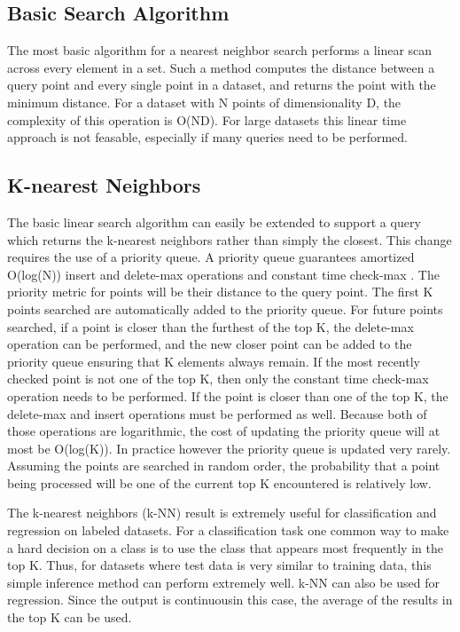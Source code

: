 \subsection{Basic Search Algorithm}

The most basic algorithm for a nearest neighbor search performs a linear scan across every element in a set.  Such a method computes the distance between a query point and every single point in a dataset, and returns the point with the minimum distance.  For a dataset with N points of dimensionality D, the complexity of this operation is O(ND).  For large datasets this linear time approach is not feasable, especially if many queries need to be performed.

\subsection{K-nearest Neighbors}
\label{subsec:knn}

The basic linear search algorithm can easily be extended to support a query which returns the k-nearest neighbors rather than simply the closest.  This change requires the use of a priority queue.  A priority queue guarantees amortized O(log(N)) insert and delete-max operations and constant time check-max \citep{van1976design}.  The priority metric for points will be their distance to the query point.  The first K points searched are automatically added to the priority queue.  For future points searched, if a point is closer than the furthest of the top K, the delete-max operation can be performed, and the new closer point can be added to the priority queue ensuring that K elements always remain.  If the most recently checked point is not one of the top K, then only the constant time check-max operation needs to be performed.  If the point is closer than one of the top K, the delete-max and insert operations must be performed as well.  Because both of those operations are logarithmic, the cost of updating the priority queue will at most be O(log(K)).  In practice however the priority queue is updated very rarely.  Assuming the points are searched in random order, the probability that a point being processed will be one of the current top K encountered is relatively low.

The k-nearest neighbors (k-NN) result is extremely useful for classification and regression on labeled datasets.  For a classification task one common way to make a hard decision on a class is to use the class that appears most frequently in the top K.  Thus, for datasets where test data is very similar to training data, this simple inference method can perform extremely well.  k-NN can also be used for regression.  Since the output is continuousin this case, the average of the results in the top K can be used.

